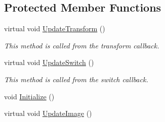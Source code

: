 \subsection*{Protected Member Functions}
\begin{DoxyCompactItemize}
\item 
virtual void \hyperlink{classosa_o_s_g_image_a4293445d5104d1d30100528b5e87dfe8}{Update\-Transform} ()
\begin{DoxyCompactList}\small\item\em This method is called from the transform callback. \end{DoxyCompactList}\item 
virtual void \hyperlink{classosa_o_s_g_image_a491071217b513d3faa7a89eb6fff0808}{Update\-Switch} ()
\begin{DoxyCompactList}\small\item\em This method is called from the switch callback. \end{DoxyCompactList}\item 
void \hyperlink{classosa_o_s_g_image_a411b66846a100e09a8a642ebdac50541}{Initialize} ()
\item 
virtual void \hyperlink{classosa_o_s_g_image_a72cd21e7b7e8c272737c7499d05b54ac}{Update\-Image} ()
\end{DoxyCompactItemize}
